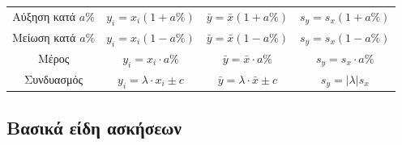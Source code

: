 \documentclass[a4paper,11pt]{article}
\begin{document}
\begin{enumerate}[resume]
\begin{center}
\begin{tabular}{|c|c|c|c|}
Αύξηση κατά $a\%$ &\rule[-2ex]{0mm}{5.5ex}$y_i=x_i\left(1+a\%\right)$ & $\bar{y}=\bar{x}\left(1+a\%\right)$ & $s_y=s_x\left(1+a\%\right)$\\
Μείωση κατά $a\%$ &\rule[-2ex]{0mm}{5.5ex}$y_i=x_i\left(1-a\%\right)$ & $\bar{y}=\bar{x}\left(1-a\%\right)$ & $s_y=s_x\left(1-a\%\right)$\\
Μέρος &\rule[-2ex]{0mm}{5.5ex}$y_i=x_i\cdot a\%$ & $\bar{y}=\bar{x}\cdot a\%$ & $s_y=s_x\cdot a\%$\\
Συνδυασμός &\rule[-2ex]{0mm}{5.5ex}$y_i=\lambda\cdot x_i\pm c$ & $\bar{y}=\lambda\cdot\bar{x}\pm c$ & $s_y=|\lambda|s_x$\\
\hline
\end{tabular}\label{pinakas3}
\end{center}
\end{enumerate}
\newpage
\begin{center}
\part{Βασικά είδη ασκήσεων}
\end{center}
\end{document}
